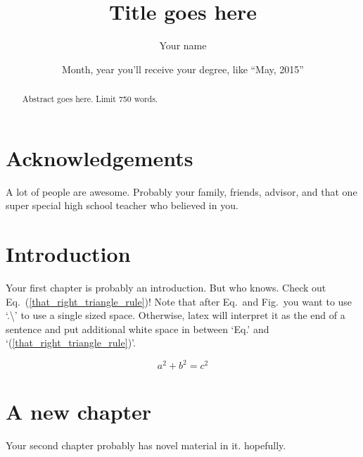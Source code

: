 \documentclass[letterpaper,11pt]{yalephd}
\begin{document}
\title{Title goes here}
\author{Your name}
\date{Month, year you'll receive your degree, like ``May, 2015''} %

\frontmatter

\begin{abstract}
Abstract goes here. Limit 750 words.
\end{abstract}


\maketitle
{} %
\tableofcontents
\listoffigures %
\listoftables %

\chapter{Acknowledgements} %
A lot of people are awesome. Probably your family, friends, 
advisor, and that one super special high school teacher who
believed in you.

\mainmatter

\chapter{Introduction}
Your first chapter is probably an introduction. But who knows. Check out Eq.\ (\ref{that_right_triangle_rule})!
Note that after Eq.\ and Fig.\ you want to use `.\textbackslash'  to use a single sized space. Otherwise,
latex will interpret it as the end of a sentence and put additional white space in between `Eq.' and 
`(\ref{that_right_triangle_rule})'.

\begin{equation}
a^2 + b^2 = c^2 \label{that_right_triangle_rule}
\end{equation}

\chapter{A new chapter}
Your second chapter probably has novel material in it. hopefully.

\end{document}
